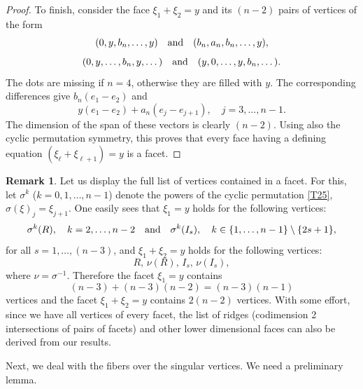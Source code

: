 \documentclass[a4paper,11pt,reqno]{amsart}
\theoremstyle{definition}
\newtheorem{rem}[thm]{Remark}
\numberwithin{equation}{section}
\newcommand{\be}{\begin{equation}}
\newcommand{\ee}{\end{equation}}
\begin{document}
\begin{proof}
To finish, consider the face $\xi_1 + \xi_2 =y$ and its $(n-2)$  pairs of vertices of the form
\be
(0,y,b_n,\dots,y)
\quad\hbox{and}\quad
(b_n,a_n, b_n,\dots, y),
\ee
\be
(0,y,\dots, b_n,y, \dots )
\quad\hbox{and}\quad
(y,0,\dots, y,b_n,\dots).
\ee
The dots are missing if $n=4$, otherwise they are filled with $y$.
The corresponding differences give $b_n(e_1-e_2)$ and
\be
y(e_1-e_2) + a_n (e_j - e_{j+1}),\quad  j=3,\dots, n-1.
\ee
The dimension of the span of these vectors is clearly $(n-2)$.
Using also the cyclic permutation symmetry, this proves that every face having a defining
equation $(\xi_\ell + \xi_{\ell +1}) =y$ is a facet.
\end{proof}


\begin{rem}\label{rem52}
Let us display the full list of vertices contained in a facet.
For this, let $\sigma^k$ ($k=0,1, \dots, n-1$) denote the powers of the cyclic permutation \eqref{T25}, $\sigma(\xi)_j = \xi_{j+1}$.
One easily sees that $\xi_1=y$ holds for the following vertices:
\be
\sigma^k(R), \quad k=2,\dots, n-2
\quad \hbox{and}\quad \sigma^k(I_s), \quad k\in \{ 1,\dots, n-1\}\setminus \{2s+1\},
\label{57}\ee
for all $s=1,\dots, (n-3)$,
and $\xi_1+\xi_2 =y$ holds for the following vertices:
\be
R,\, \nu(R),\, I_s,\, \nu(I_s),
\label{59}\ee
where $\nu = \sigma^{-1}$.
Therefore the facet $\xi_1=y$ contains
\be
(n-3) + (n-3)(n-2) = (n-3)(n-1)
\label{58}\ee
vertices and the facet $\xi_1+\xi_2 =y$ contains
$2(n-2)$ vertices.
With some effort, since we have all vertices of every facet, the list of ridges
(codimension 2 intersections of pairs of facets) and other lower dimensional faces can also be derived from our results.
\end{rem}


Next, we deal with the fibers over the singular vertices.
We need a preliminary lemma.
\end{document}
